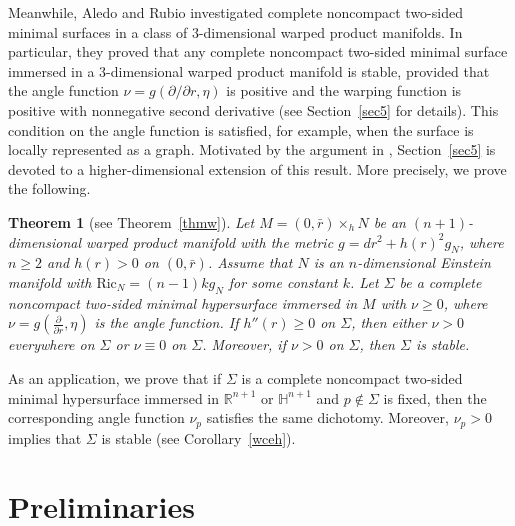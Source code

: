 \documentclass[amssymb,amstex,amsmath,11pt]{article}
\numberwithin{equation}{section}
\theoremstyle{plain}
\newtheorem*{thm*}{Theorem}
\theoremstyle{definition}
\theoremstyle{remark}
\begin{document}
Meanwhile, Aledo and Rubio \cite{A&R16} investigated complete noncompact two-sided minimal surfaces in a class of $3$-dimensional warped product manifolds.
In particular, they proved that any complete noncompact two-sided minimal surface immersed in a $3$-dimensional warped product manifold is stable, provided that the angle function $\nu = g(\partial/\partial r,\eta)$ is positive and the warping function is positive with nonnegative second derivative (see Section~\ref{sec5} for details).
This condition on the angle function is satisfied, for example, when the surface is locally represented as a graph. Motivated by the argument in \cite{A&R16}, Section~\ref{sec5} is devoted to a higher-dimensional extension of this result. More precisely, we prove the following.

\begin{thm*}[see Theorem~\ref{thmw}]
Let $M=(0,\bar{r})\times_h N$ be an $(n+1)$-dimensional  warped product manifold with the metric $g=dr^2+h(r)^2g_N$, where $n\ge 2$ and $h(r)>0$ on $(0,\bar{r})$. Assume that $N$ is an $n$-dimensional Einstein manifold with $\mathrm{Ric}_N = (n-1)k g_N$ for some constant $k$. Let $\Sigma$ be a complete noncompact two-sided minimal hypersurface immersed in $M$ with $\nu\geq0$, where $\nu=g\!\left(\frac{\partial}{\partial r},\eta\right)$ is the angle function. If $h''(r)\geq0$ on $\Sigma$, then either $\nu>0$ everywhere on $\Sigma$ or $\nu\equiv 0$ on $\Sigma$. Moreover, if $\nu>0$ on $\Sigma$, then $\Sigma$ is stable.
\end{thm*}



\noindent As an application, we prove that if $\Sigma$ is a complete noncompact two-sided minimal hypersurface immersed in $\mathbb{R}^{n+1}$ or $\mathbb{H}^{n+1}$ and $p\notin\Sigma$ is fixed, then the corresponding angle function $\nu_p$ satisfies the same dichotomy. Moreover, $\nu_p>0$ implies that $\Sigma$ is stable (see Corollary~\ref{wceh}).









\section{Preliminaries} \label{sec2}
\end{document}
